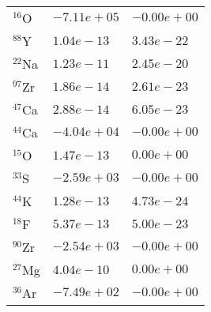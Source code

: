 \begin{tabular}{lll}
 $^{16}$O   & $-7.11e+05 $                                                       & $-0.00e+00 $                                                                    \\
 $^{88}$Y   & $1.04e-13 $                                                        & $3.43e-22 $                                                                     \\
 $^{22}$Na  & $1.23e-11 $                                                        & $2.45e-20 $                                                                     \\
 $^{97}$Zr  & $1.86e-14 $                                                        & $2.61e-23 $                                                                     \\
 $^{47}$Ca  & $2.88e-14 $                                                        & $6.05e-23 $                                                                     \\
 $^{44}$Ca  & $-4.04e+04 $                                                       & $-0.00e+00 $                                                                    \\
 $^{15}$O   & $1.47e-13 $                                                        & $0.00e+00 $                                                                     \\
 $^{33}$S   & $-2.59e+03 $                                                       & $-0.00e+00 $                                                                    \\
 $^{44}$K   & $1.28e-13 $                                                        & $4.73e-24 $                                                                     \\
 $^{18}$F   & $5.37e-13 $                                                        & $5.00e-23 $                                                                     \\
 $^{90}$Zr  & $-2.54e+03 $                                                       & $-0.00e+00 $                                                                    \\
 $^{27}$Mg  & $4.04e-10 $                                                        & $0.00e+00 $                                                                     \\
 $^{36}$Ar  & $-7.49e+02 $                                                       & $-0.00e+00 $                                                                    \\

\end{tabular}
